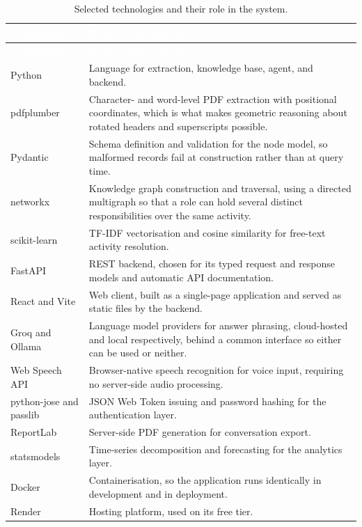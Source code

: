 \begin{longtable}{|p{}|p{}|}
\caption{Selected technologies and their role in the system.}\label{tab:tech}\\
\hline
\rowcolor{myblue}\textcolor{white}{\textbf{Technology}} & \textcolor{white}{\textbf{Role in the system}} \\
\hline
\endfirsthead
\hline
\rowcolor{myblue}\textcolor{white}{\textbf{Technology}} & \textcolor{white}{\textbf{Role in the system}} \\
\hline
\endhead
Python & Language for extraction, knowledge base, agent, and backend. \\ \hline
pdfplumber & Character- and word-level PDF extraction with positional coordinates, which is what makes geometric reasoning about rotated headers and superscripts possible. \\ \hline
Pydantic & Schema definition and validation for the node model, so malformed records fail at construction rather than at query time. \\ \hline
networkx & Knowledge graph construction and traversal, using a directed multigraph so that a role can hold several distinct responsibilities over the same activity. \\ \hline
scikit-learn & TF-IDF vectorisation and cosine similarity for free-text activity resolution. \\ \hline
FastAPI & REST backend, chosen for its typed request and response models and automatic API documentation. \\ \hline
React and Vite & Web client, built as a single-page application and served as static files by the backend. \\ \hline
Groq and Ollama & Language model providers for answer phrasing, cloud-hosted and local respectively, behind a common interface so either can be used or neither. \\ \hline
Web Speech API & Browser-native speech recognition for voice input, requiring no server-side audio processing. \\ \hline
python-jose and passlib & JSON Web Token issuing and password hashing for the authentication layer. \\ \hline
ReportLab & Server-side PDF generation for conversation export. \\ \hline
statsmodels & Time-series decomposition and forecasting for the analytics layer. \\ \hline
Docker & Containerisation, so the application runs identically in development and in deployment. \\ \hline
Render & Hosting platform, used on its free tier. \\ \hline
\end{longtable}

